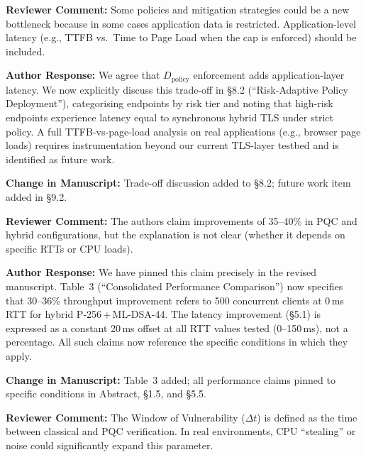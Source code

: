 \documentclass[12pt]{article}
\newcommand{\RC}[1]{\textcolor{reviewerblue}{\textbf{Reviewer Comment:}} #1}
\newcommand{\AR}[1]{\textcolor{replygreen}{\textbf{Author Response:}} #1}
\newcommand{\CH}[1]{\textcolor{changemagenta}{\textbf{Change in Manuscript:}} #1}
\begin{document}
\begin{reviewbox}
\RC{Some policies and mitigation strategies could be a new bottleneck because
in some cases application data is restricted.  Application-level latency
(e.g., TTFB vs.\ Time to Page Load when the cap is enforced) should be included.}
\end{reviewbox}

\begin{replybox}
\AR{We agree that $D_{\text{policy}}$ enforcement adds application-layer
latency.  We now explicitly discuss this trade-off in \S8.2
(``Risk-Adaptive Policy Deployment''), categorising endpoints by risk
tier and noting that high-risk endpoints experience latency equal to
synchronous hybrid TLS under strict policy.  A full TTFB-vs-page-load
analysis on real applications (e.g., browser page loads) requires
instrumentation beyond our current TLS-layer testbed and is identified
as future work.}

\CH{Trade-off discussion added to \S8.2; future work item added in \S9.2.}
\end{replybox}

\begin{reviewbox}
\RC{The authors claim improvements of 35--40\% in PQC and hybrid configurations,
but the explanation is not clear (whether it depends on specific RTTs or CPU
loads).}
\end{reviewbox}

\begin{replybox}
\AR{We have pinned this claim precisely in the revised manuscript.
Table~3 (``Consolidated Performance Comparison'') now specifies that
30--36\% throughput improvement refers to 500 concurrent clients at 0\,ms RTT
for hybrid P-256\,+\,ML-DSA-44.  The latency improvement (\S5.1) is expressed
as a constant 20\,ms offset at all RTT values tested (0--150\,ms), not a
percentage.  All such claims now reference the specific conditions in which
they apply.}

\CH{Table~3 added; all performance claims pinned to specific conditions
in Abstract, \S1.5, and \S5.5.}
\end{replybox}

\begin{reviewbox}
\RC{The Window of Vulnerability ($\Delta t$) is defined as the time between
classical and PQC verification.  In real environments, CPU ``stealing'' or noise
could significantly expand this parameter.}
\end{reviewbox}
\end{document}
